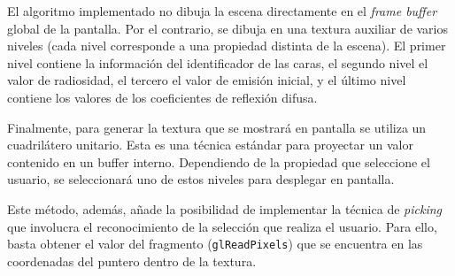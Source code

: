 El algoritmo implementado no dibuja la escena directamente en el \textit{frame buffer} global de la pantalla. Por el contrario, se dibuja en una textura auxiliar de varios niveles (cada nivel corresponde a una propiedad distinta de la escena). El primer nivel contiene la información del identificador de las caras, el segundo nivel el valor de radiosidad, el tercero el valor de emisión inicial, y el último nivel contiene los valores de los coeficientes de reflexión difusa.

Finalmente, para generar la textura que se mostrará en pantalla se utiliza un cuadrilátero unitario. Esta es una técnica estándar para proyectar un valor contenido en un buffer interno. Dependiendo de la propiedad que seleccione el usuario, se seleccionará uno de estos niveles para desplegar en pantalla.

Este método, además, añade la posibilidad de implementar la técnica de \textit{picking} que involucra el reconocimiento de la selección que realiza el usuario. Para ello, basta obtener el valor del fragmento (\verb|glReadPixels|) que se encuentra en las coordenadas del puntero dentro de la textura.

